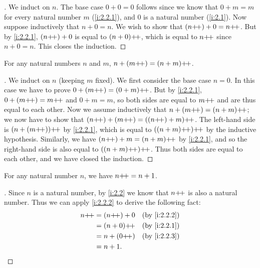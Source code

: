 \begin{proof}[]
  We induct on \(n\).
  The base case \(0 + 0 = 0\) follows since we know that \(0 + m = m\) for every natural number \(m\) (\cref{i:2.2.1}), and \(0\) is a natural number (\cref{i:2.1}).
  Now suppose inductively that \(n + 0 = n\).
  We wish to show that \((n{+}\!{+}) + 0 = n{+}\!{+}\).
  But by \cref{i:2.2.1}, \((n{+}\!{+}) + 0\) is equal to \((n + 0){+}\!{+}\), which is equal to \(n{+}\!{+}\) since \(n + 0 = n\).
  This closes the induction.
\end{proof}

\begin{lem}\label{i:2.2.3}
  For any natural numbers \(n\) and \(m\), \(n + (m{+}\!{+}) = (n + m){+}\!{+}\).
\end{lem}

\begin{proof}[]
  We induct on \(n\) (keeping \(m\) fixed).
  We first consider the base case \(n = 0\).
  In this case we have to prove \(0 + (m{+}\!{+}) = (0 + m){+}\!{+}\).
  But by \cref{i:2.2.1}, \(0 + (m{+}\!{+}) = m{+}\!{+}\) and \(0 + m = m\), so both sides are equal to \(m{+}\!{+}\) and are thus equal to each other.
  Now we assume inductively that \(n + (m{+}\!{+}) = (n + m){+}\!{+}\);
  we now have to show that \((n{+}\!{+}) + (m{+}\!{+}) = ((n{+}\!{+}) + m){+}\!{+}\).
  The left-hand side is \((n + (m{+}\!{+})){+}\!{+}\) by \cref{i:2.2.1}, which is equal to \(((n+m){+}\!{+}){+}\!{+}\) by the inductive hypothesis.
  Similarly, we have \((n{+}\!{+}) + m = (n + m){+}\!{+}\) by \cref{i:2.2.1}, and so the right-hand side is also equal to \(((n + m){+}\!{+}){+}\!{+}\).
  Thus both sides are equal to each other, and we have closed the induction.
\end{proof}

\begin{ac}\label{i:ac:2.2.2}
  For any natural number \(n\), we have \(n{+}\!{+} = n + 1\).
\end{ac}

\begin{proof}[]
  Since \(n\) is a natural number, by \cref{i:2.2} we know that \(n{+}\!{+}\) is also a natural number.
  Thus we can apply \cref{i:2.2.2} to derive the following fact:
  \begin{align*}
    n\pp & = (n\pp) + 0 &  & \by{i:2.2.2} \\
         & = (n + 0)\pp &  & \by{i:2.2.1} \\
         & = n + (0\pp) &  & \by{i:2.2.3} \\
         & = n + 1.
  \end{align*}
\end{proof}

